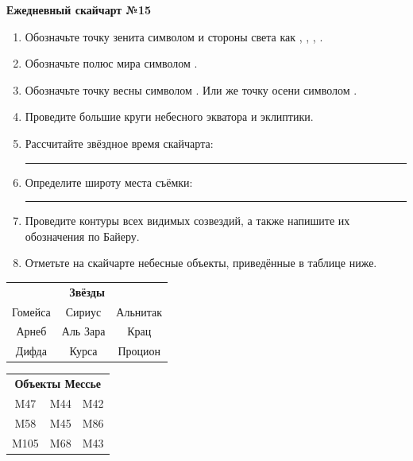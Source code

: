\documentclass{./SAS-class-skygen}
\begin{document}
    
    
    
	\begin{center}
		\large\textbf{Ежедневный скайчарт №15}
	\end{center}

	\begin{enumerate}
		\item Обозначьте точку зенита символом  и стороны света как , , , .
		\item Обозначьте полюс мира символом .
		\item Обозначьте точку весны символом \Aries. Или же точку осени символом \Libra.
		\item Проведите большие круги небесного экватора и эклиптики.
		\item Рассчитайте звёздное время скайчарта: \rule{2cm}{0.4pt}
		\item Определите широту места съёмки: \rule{2cm}{0.4pt}
		\item Проведите контуры всех видимых созвездий, а также напишите их обозначения по Байеру.
		\item Отметьте на скайчарте небесные объекты, приведённые в таблице ниже.
	\end{enumerate}
	
    \vspace{0.5cm}

    \begin{table}[h!]
    \centering
    \begin{tabular}{ccc}
    \multicolumn{3}{c}{\textbf{Звёзды}} \\ Гомейса & Сириус & Альнитак \\
Арнеб & Аль Зара & Крац \\
Дифда & Курса & Процион \\

\end{tabular}
    \hfill
    \begin{tabular}{ccc}
    \multicolumn{3}{c}{\textbf{Объекты Мессье}} \\ M47 & M44 & M42 \\
M58 & M45 & M86 \\
M105 & M68 & M43 \\

\end{tabular}
    \end{table}
	
\end{document}
